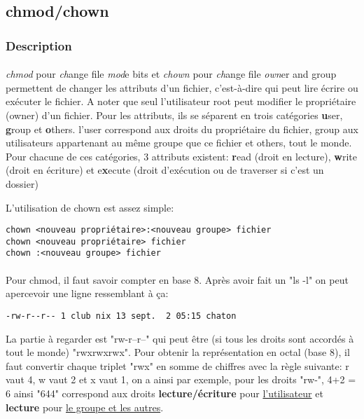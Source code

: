 \subsection*{chmod/chown}
\subsubsection*{Description}

\paragraph{}
\emph{chmod} pour \emph{ch}ange file \emph{mod}e bits et \emph{chown} pour
\emph{ch}ange file \emph{own}er and group permettent de changer les attributs
d'un fichier, c'est-à-dire qui peut lire écrire ou exécuter le fichier.  A
noter que seul l'utilisateur root peut modifier le propriétaire (owner) d'un
fichier.  Pour les attributs, ils se séparent en trois catégories
\textbf{u}ser, \textbf{g}roup et \textbf{o}thers.  l'user correspond aux droits
du propriétaire du fichier, group aux utilisateurs appartenant au même groupe
que ce fichier et others, tout le monde.\\
Pour chacune de ces catégories, 3 attributs existent: \textbf{r}ead (droit en
lecture), \textbf{w}rite (droit en écriture) et e\textbf{x}ecute (droit
d’exécution ou de traverser si c'est un dossier)

\noindent L'utilisation de chown est assez simple:
\begin{lstlisting}
chown <nouveau propriétaire>:<nouveau groupe> fichier
chown <nouveau propriétaire> fichier
chown :<nouveau groupe> fichier
\end{lstlisting}

\paragraph{}
Pour chmod, il faut savoir compter en base 8. Après avoir fait un "ls -l" on
peut apercevoir une ligne ressemblant à ça:

\begin{lstlisting}
-rw-r--r-- 1 club nix 13 sept.  2 05:15 chaton
\end{lstlisting}
La partie à regarder est "rw-r--r--" qui peut être (si tous les droits sont
accordés à tout le monde) "rwxrwxrwx".  Pour obtenir la représentation en octal
(base 8), il faut convertir chaque triplet "rwx" en somme de chiffres avec la
règle suivante: r vaut 4, w vaut 2 et x vaut 1, on a ainsi par exemple, pour
les droits "rw-", 4+2 = 6 ainsi "644" correspond aux droits
\textbf{lecture/écriture} pour \underline{l'utilisateur} et \textbf{lecture}
pour \underline{le groupe et les autres}.

